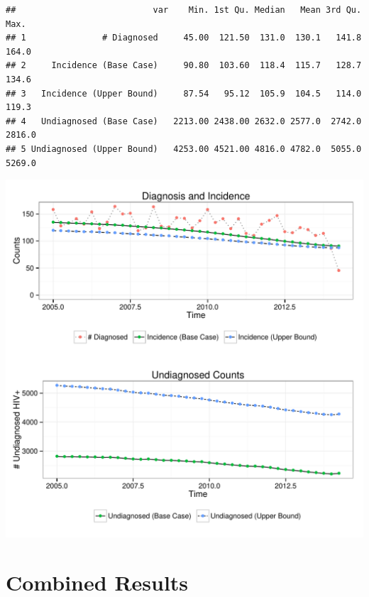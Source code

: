 \documentclass{article}\usepackage[]{graphicx}\usepackage[]{color}
\makeatletter
\def\maxwidth{ %
  \ifdim\Gin@nat@width>\linewidth
    \linewidth
  \else
    \Gin@nat@width
  \fi
}
\newenvironment{kframe}{%
 \def\at@end@of@kframe{}%
 \ifinner\ifhmode%
  \def\at@end@of@kframe{\end{minipage}}%
  \begin{minipage}{\columnwidth}%
 \fi\fi%
 \def\FrameCommand##1{\hskip\@totalleftmargin \hskip-\fboxsep
 \colorbox{shadecolor}{##1}\hskip-\fboxsep
     \hskip-\linewidth \hskip-\@totalleftmargin \hskip\columnwidth}%
 \MakeFramed {\advance\hsize-\width
   \@totalleftmargin\z@ \linewidth\hsize
   \@setminipage}}%
 {\par\unskip\endMakeFramed%
 \at@end@of@kframe}
\newenvironment{knitrout}{}{} %
\makeatother
\begin{document}
\begin{knitrout}\footnotesize
{}\color{fgcolor}\begin{kframe}
\begin{verbatim}
##                           var    Min. 1st Qu. Median   Mean 3rd Qu.   Max.
## 1               # Diagnosed     45.00  121.50  131.0  130.1   141.8  164.0
## 2     Incidence (Base Case)     90.80  103.60  118.4  115.7   128.7  134.6
## 3   Incidence (Upper Bound)     87.54   95.12  105.9  104.5   114.0  119.3
## 4   Undiagnosed (Base Case)   2213.00 2438.00 2632.0 2577.0  2742.0 2816.0
## 5 Undiagnosed (Upper Bound)   4253.00 4521.00 4816.0 4782.0  5055.0 5269.0
\end{verbatim}
\end{kframe}

{\centering \includegraphics[width=\maxwidth]{figure/minimal-impute} 

}



\end{knitrout}


\section{Combined Results}
\end{document}
